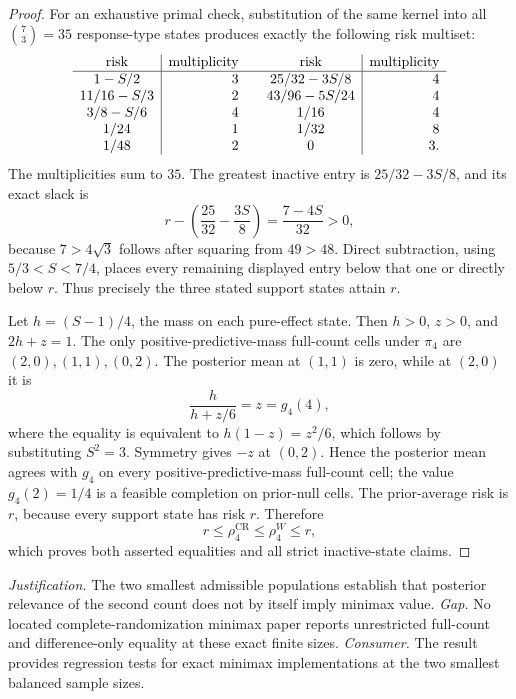 \documentclass{article}
\begin{document}
\begin{proof}
For an exhaustive primal check, substitution of the same kernel into all \(\binom73=35\) response-type states produces exactly the following risk multiset:
\[
\begin{array}{c|r@{\qquad}c|r}
\text{risk}&\text{multiplicity}&\text{risk}&\text{multiplicity}\\ \hline
1-S/2&3&25/32-3S/8&4\\
11/16-S/3&2&43/96-5S/24&4\\
3/8-S/6&4&1/16&4\\
1/24&1&1/32&8\\
1/48&2&0&3.
\end{array}
\]
The multiplicities sum to \(35\).  The greatest inactive entry is \(25/32-3S/8\), and its exact slack is
\[
 r-\left(\frac{25}{32}-\frac{3S}{8}\right)
 =\frac{7-4S}{32}>0,
\]
because \(7>4\sqrt3\) follows after squaring from \(49>48\).  Direct subtraction, using \(5/3<S<7/4\), places every remaining displayed entry below that one or directly below \(r\).  Thus precisely the three stated support states attain \(r\).

Let \(h=(S-1)/4\), the mass on each pure-effect state.  Then \(h>0\), \(z>0\), and \(2h+z=1\).  The only positive-predictive-mass full-count cells under \(\pi_4\) are \((2,0),(1,1),(0,2)\).  The posterior mean at \((1,1)\) is zero, while at \((2,0)\) it is
\[
 \frac{h}{h+z/6}=z=g_4(4),
\]
where the equality is equivalent to \(h(1-z)=z^2/6\), which follows by substituting \(S^2=3\).  Symmetry gives \(-z\) at \((0,2)\).  Hence the posterior mean agrees with \(g_4\) on every positive-predictive-mass full-count cell; the value \(g_4(2)=1/4\) is a feasible completion on prior-null cells.  The prior-average risk is \(r\), because every support state has risk \(r\).  Therefore
\[
 r\leq\rho_4^{\mathrm{CR}}\leq\rho_4^W\leq r,
\]
which proves both asserted equalities and all strict inactive-state claims.
\end{proof}
\par\smallskip\noindent \textit{Justification.} The two smallest admissible populations establish that posterior relevance of the second count does not by itself imply minimax value. \textit{Gap.} No located complete-randomization minimax paper reports unrestricted full-count and difference-only equality at these exact finite sizes. \textit{Consumer.} The result provides regression tests for exact minimax implementations at the two smallest balanced sample sizes.
\end{document}
